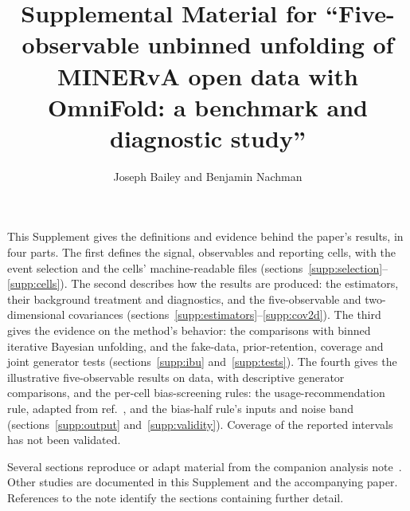 \documentclass[11pt]{article}
\title{Supplemental Material for ``Five-observable unbinned unfolding of MINERvA open data with OmniFold: a benchmark and
diagnostic study''}
\author{Joseph Bailey and Benjamin Nachman}
\date{}
\begin{document}
\maketitle

This Supplement gives the definitions and evidence behind the paper's results, in four parts. The first defines the signal, observables and reporting cells, with the event selection and the cells' machine-readable files (sections~\ref{supp:selection}--\ref{supp:cells}). The second describes how the results are produced: the estimators, their background treatment and diagnostics, and the five-observable and two-dimensional covariances (sections~\ref{supp:estimators}--\ref{supp:cov2d}). The third gives the evidence on the method's behavior: the comparisons with binned iterative Bayesian unfolding, and the fake-data, prior-retention, coverage and joint generator tests (sections~\ref{supp:ibu} and~\ref{supp:tests}). The fourth gives the illustrative five-observable results on data, with descriptive generator comparisons, and the per-cell bias-screening rules: the usage-recommendation rule, adapted from ref.~\cite{ATLAS:2024jets}, and the bias-half rule's inputs and noise band (sections~\ref{supp:output} and~\ref{supp:validity}).
Coverage of the reported intervals has not been validated.

Several sections reproduce or adapt material from the companion analysis note~\cite{AnalysisNote2026}. Other studies
are documented in this Supplement and the accompanying paper. References to the note identify the sections containing
further detail.
\end{document}
